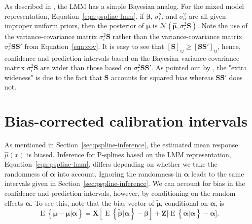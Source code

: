 \documentclass[cmfont,usenames,dvipsnames,leqno]{afit-etd}\usepackage[]{graphicx}\usepackage[]{color}
\newcommand{\mc}[1]{\ensuremath{\mathcal{#1}}}
\newcommand{\wh}[1]{\ensuremath{\widehat{#1}}}
\newcommand{\wt}[1]{\ensuremath{\widetilde{#1}}}
\newcommand{\E}{\operatorname{E}}
\begin{document}
As described in \citet{robinson_that_1991}, the LMM has a simple Bayesian analog. For the mixed model representation, Equation~\eqref{eqn:pspline-lmm}, if $\bm{\beta}$, $\sigma_\epsilon^2$, and $\sigma_\alpha^2$ are all given improper uniform priors, then the posterior of $\bm{\mu}$ is $\mc{N}\left( \wh{\bm{\mu}}, \sigma_\epsilon^2 \bm{S} \right)$. Note the use of the variance-covariance matrix $\sigma_\epsilon^2\bm{S}$ rather than the variance-covariance matrix $\sigma_\epsilon^2\bm{S}\bm{S}'$ from Equation~\eqref{eqn:cov}. It is easy to see that $\left[\bm{S}\right]_{ij} \ge \left[\bm{S}\bm{S}'\right]_{ij}$, hence, confidence and prediction intervals based on the Bayesian variance-covariance matrix $\sigma_\epsilon^2\bm{S}$ are wider than those based on $\sigma_\epsilon^2\bm{S}\bm{S}'$. As pointed out by \citet{hastie_gams_1990}, the "extra wideness" is due to the fact that $\bm{S}$ accounts for squared bias whereas $\bm{S}\bm{S}'$ does not.

\section{Bias-corrected calibration intervals}
\label{sec:adjusted-calibration}
As mentioned in Section~\ref{sec:pspline-inference}, the estimated mean response $\wh{\mu}(x)$ is biased. Inference for P-splines based on the LMM representation, Equation~\eqref{eqn:pspline-lmm}, differs depending on whether we take the randomness of $\bm{\alpha}$ into account. Ignoring the randomness in $\bm{\alpha}$ leads to the same intervals given in Section~\ref{sec:pspline-inference}. We can account for bias in the confidence and prediction intervals, however, by conditioning on the random effects $\bm{\alpha}$. To see this, note that the bias vector of $\wt{\bm{\mu}}$, conditional on $\bm{\alpha}$, is 
\begin{equation}
\label{eqn:conditional-bias}
  \E\left\{\wt{\bm{\mu}} - \bm{\mu} | \bm{\alpha}\right\} = \bm{X}\left[ \E\left\{\wt{\bm{\beta}} | \bm{\alpha}\right\} - \bm{\beta} \right] + \bm{Z}\Big[ \E\left\{\wt{\bm{\alpha}} | \bm{\alpha}\right\} - \bm{\alpha} \Big].
\end{equation}
\end{document}
